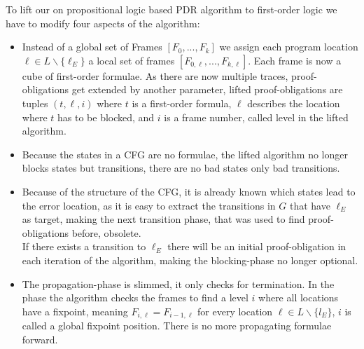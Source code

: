 \documentclass[11pt, a4paper, BCOR=10mm, ngerman]{scrbook}
\begin{document}
To lift our on propositional logic based PDR algorithm to first-order logic we have to modify four aspects of the algorithm:
\begin{itemize}
	
	\item Instead of a global set of Frames $[F_0, ..., F_k]$ we assign each program location $\ell \in L \backslash \{\ell_E\}$ a local set of frames $[F_{0, \ell}, ..., F_{k, \ell}]$. Each frame is now a cube of first-order formulae. As there are now multiple traces, proof-obligations get extended by another parameter, lifted proof-obligations are tuples $(t, \ell, i)$ where $t$ is a first-order formula, $\ell$ describes the location where $t$ has to be blocked, and $i$ is a frame number, called level in the lifted algorithm.
	
	\item 
	Because the states in a CFG are no formulae, the lifted algorithm no longer blocks states but transitions, there are no bad states only bad transitions.
	
	\item Because of the structure of the CFG, it is already known which states lead to the error location, as it is easy to extract the transitions in $G$ that have $\ell_E$ as target, making the next transition phase, that was used to find proof-obligations before, obsolete. \\ If there exists a transition to $\ell_E$ there will be an initial proof-obligation in each iteration of the algorithm, making the blocking-phase no longer optional.
	
	\item The propagation-phase is slimmed, it only checks for termination. In the phase the algorithm checks the frames to find a level $i$ where all locations have a fixpoint, meaning  $F_{i, \ell} = F_{i-1, \ell}$ for every location $\ell \in L \backslash \{l_E \}$, $i$ is called a global fixpoint position. There is no more propagating formulae forward.
\end{itemize}
\end{document}
